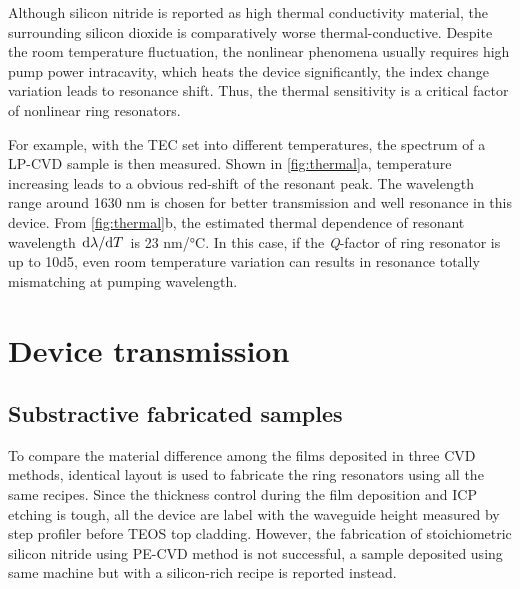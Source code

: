 %	

Although silicon nitride is reported as high thermal conductivity material, the surrounding silicon dioxide is comparatively worse thermal-conductive. Despite the room temperature fluctuation, the nonlinear phenomena usually requires high pump power intracavity, which heats the device significantly, the index change variation leads to resonance shift. Thus, the thermal sensitivity is a critical factor of nonlinear ring resonators.

For example, with the TEC set into different temperatures, the spectrum of a LP-CVD sample is then measured. Shown in \autoref{fig:thermal}a, temperature increasing leads to a obvious red-shift of the resonant peak. The wavelength range around 1630 nm is chosen for better transmission and well resonance in this device. From \autoref{fig:thermal}b, the estimated thermal dependence of resonant wavelength $\dv*{\lambda}{T}$ is 23 \si{\nm/\celsius}. In this case, if the \textit{Q}-factor of ring resonator is up to \num{10d5}, even room temperature variation can results in resonance totally mismatching at pumping wavelength.

\section{Device transmission}

\subsection{Substractive fabricated samples}

To compare the material difference among the films deposited in three CVD methods, identical layout is used to fabricate the ring resonators using all the same recipes. %
Since the thickness control during the film deposition and ICP etching is tough, all the device are label with the waveguide height measured by step profiler before TEOS top cladding. However, the fabrication of stoichiometric silicon nitride using PE-CVD method is not successful, a sample deposited using same machine but with a silicon-rich recipe is reported instead. 

